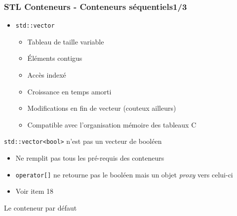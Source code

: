 \documentclass[C++.tex]{subfiles}
\begin{document}
\begin{frame}[fragile]
	\frametitle{STL Conteneurs - Conteneurs séquentiels\titlehfill{}1/3}
	\begin{itemize}
		\item \lstinline|std::vector|
		\begin{itemize}
			\item Tableau de taille variable
			\item Éléments contigus
			\item Accès indexé
			\item Croissance en temps amorti
			\item Modifications en fin de vecteur (couteux ailleurs)


			\item Compatible avec l'organisation mémoire des tableaux C


		\end{itemize}
	\end{itemize}

	\begin{alertblock}{\lstinline|std::vector<bool>| n'est pas un vecteur de booléen}
		\begin{itemize}
			\item Ne remplit pas tous les pré-requis des conteneurs
			\item \lstinline|operator[]| ne retourne pas le booléen mais un objet \textit{proxy} vers celui-ci
			\item Voir \cite{effStl} item 18


		\end{itemize}
	\end{alertblock}

	\begin{exampleblock}{Le conteneur par défaut}
	\end{exampleblock}
\end{frame}
\end{document}

